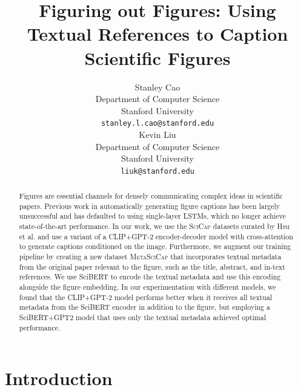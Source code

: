 \documentclass{article}
\title{
  Figuring out Figures: Using Textual References to Caption Scientific Figures \\
  \vspace{1em}
}
\author{
  Stanley Cao \\
  Department of Computer Science \\
  Stanford University \\
  \texttt{stanley.l.cao@stanford.edu} \\
  \And
  Kevin Liu \\
  Department of Computer Science \\
  Stanford University \\
  \texttt{liuk@stanford.edu} \\
}
\newcommand{\msc}{\textsc{MetaSciCap}\xspace}
\newcommand{\scicap}{\textsc{SciCap}\xspace}
\begin{document}
\maketitle

\begin{abstract}
  Figures are essential channels for densely communicating complex ideas in scientific papers. Previous work in automatically generating figure captions has been largely unsuccessful and has defaulted to using single-layer LSTMs, which no longer achieve state-of-the-art performance. In our work, we use the \scicap datasets curated by Hsu et al. \citep{scicap} and use a variant of a CLIP+GPT-2 encoder-decoder model with cross-attention to generate captions conditioned on the image. Furthermore, we augment our training pipeline by creating a new dataset \msc that incorporates textual metadata from the original paper relevant to the figure, such as the title, abstract, and in-text references. We use SciBERT to encode the textual metadata and use this encoding alongside the figure embedding. In our experimentation with different models, we found that the CLIP+GPT-2 model performs better when it receives all textual metadata from the SciBERT encoder in addition to the figure, but employing a SciBERT+GPT2 model that uses only the textual metadata achieved optimal performance.
\end{abstract}



\section{Introduction}
\end{document}
